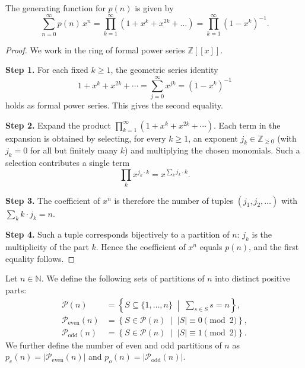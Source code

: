 \begin{lemma}\label{lemma:gen-func-p}\leanok{}
The generating function for $p(n)$ is given by
$$\sum_{n=0}^\infty p(n)\,x^n=\prod_{k=1}^\infty(1+x^k+x^{2k}+\ldots)=\prod_{k=1}^{\infty}(1-x^k)^{-1}.$$
\end{lemma}
\begin{proof}\leanok
We work in the ring of formal power series $\mathbb{Z}[[x]]$.

\textbf{Step 1.} For each fixed $k \geq 1$, the geometric series identity
$$1 + x^k + x^{2k} + \cdots = \sum_{j=0}^\infty x^{jk} = (1 - x^k)^{-1}$$
holds as formal power series. This gives the second equality.

\textbf{Step 2.} Expand the product $\prod_{k=1}^\infty (1 + x^k + x^{2k} + \cdots)$. Each term in the expansion is obtained by selecting, for every $k \geq 1$, an exponent $j_k \in \mathbb{Z}_{\geq 0}$ (with $j_k = 0$ for all but finitely many $k$) and multiplying the chosen monomials. Such a selection contributes a single term
$$\prod_k x^{j_k \cdot k} = x^{\sum_k j_k \cdot k}.$$

\textbf{Step 3.} The coefficient of $x^n$ is therefore the number of tuples $(j_1, j_2, \ldots)$ with $\sum_k k \cdot j_k = n$.

\textbf{Step 4.} Such a tuple corresponds bijectively to a partition of $n$: $j_k$ is the multiplicity of the part $k$. Hence the coefficient of $x^n$ equals $p(n)$, and the first equality follows.
\end{proof}

\begin{definition}\label{def:distinct-partitions}\leanok

Let $n \in \mathbb{N}$. We define the following sets of partitions of $n$ into distinct positive parts:
\begin{align*}
\mathcal{P}(n) &= \left\{ S \subseteq \{1, \ldots, n\} \;\middle|\; \sum_{s \in S} s = n \right\}, \\
\mathcal{P}_{\mathrm{even}}(n) &= \left\{ S \in \mathcal{P}(n) \;\middle|\; |S| \equiv 0 \pmod{2} \right\}, \\
\mathcal{P}_{\mathrm{odd}}(n) &= \left\{ S \in \mathcal{P}(n) \;\middle|\; |S| \equiv 1 \pmod{2} \right\}.
\end{align*}
We further define the number of even and odd partitions of $n$ as $p_e(n) = |\mathcal{P}_{\mathrm{even}}(n)|$ and $p_o(n) = |\mathcal{P}_{\mathrm{odd}}(n)|$.
\end{definition}


